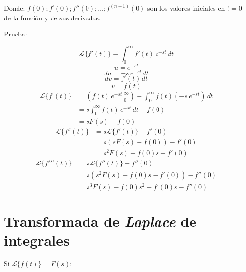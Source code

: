 Donde: $f(0);f'(0);f''(0);\ldots;f^{(n-1)}(0)$ son los valores iniciales en
$t=0$ de la función y de sus derivadas.

\underline{Prueba}:

\begin{equation*}
    \mathcal{L}\{f'(t)\}=\int_0^{\infty}f'(t)\,e^{-st}\,dt
\end{equation*}
\begin{equation*}
    u=e^{-st}
\end{equation*}
\begin{equation*}
    du=-s\,e^{-st}\,dt
\end{equation*}
\begin{equation*}
    dv=f'(t)\,dt
\end{equation*}
\begin{equation*}
    v=f(t)
\end{equation*}
\begin{equation*}
\begin{split}
    \mathcal{L}\{f'(t)\}
        &=(f(t)\,e^{-st}\Biggr|_0^{\infty})
        -\int_0^{\infty}f(t)(-s\,e^{-st})\,dt\\
        &=s\int_0^{\infty}f(t)\,e^{-st}\,dt-f(0)\\
        &=sF(s)-f(0)
\end{split}
\end{equation*}
\begin{equation*}
\begin{split}
    \mathcal{L}\{f''(t)\}
        &=s\mathcal{L}\{f'(t)\}-f'(0)\\
        &=s(sF(s)-f(0))-f'(0)\\
        &=s^2F(s)-f(0)s-f'(0)
\end{split}
\end{equation*}
\begin{equation*}
\begin{split}
    \mathcal{L}\{f\prime\prime\prime(t)\}
        &=s\mathcal{L}\{f''(t)\}-f''(0)\\
        &=s(s^2F(s)-f(0)s-f'(0))-f''(0)\\
        &=s^3F(s)-f(0)s^2-f'(0)s-f''(0)
\end{split}
\end{equation*}

\section{Transformada de \emph{Laplace} de integrales}
Si $\mathcal{L}\{f(t)\}=F(s)$:

